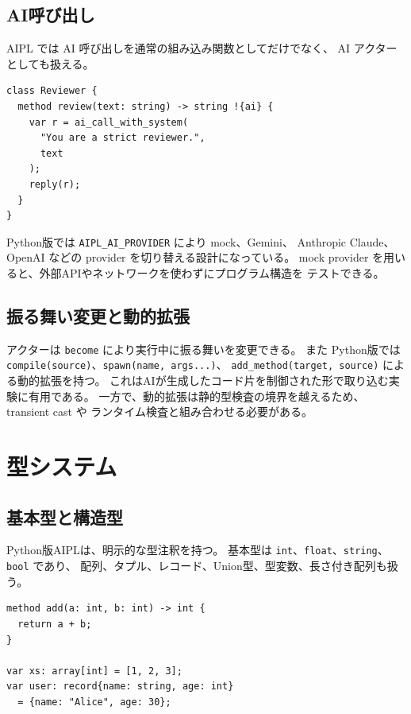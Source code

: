 \documentclass[11pt,a4paper,uplatex,dvipdfmx]{jsarticle}
\newcommand{\code}[1]{\texttt{#1}}
\begin{document}
\subsection{AI呼び出し}

AIPL では AI 呼び出しを通常の組み込み関数としてだけでなく、
AI アクターとしても扱える。

\begin{lstlisting}
class Reviewer {
  method review(text: string) -> string !{ai} {
    var r = ai_call_with_system(
      "You are a strict reviewer.",
      text
    );
    reply(r);
  }
}
\end{lstlisting}

Python版では \code{AIPL\_AI\_PROVIDER} により mock、Gemini、
Anthropic Claude、OpenAI などの provider を切り替える設計になっている。
mock provider を用いると、外部APIやネットワークを使わずにプログラム構造を
テストできる。

\subsection{振る舞い変更と動的拡張}

アクターは \code{become} により実行中に振る舞いを変更できる。
また Python版では \code{compile(source)}、\code{spawn(name, args...)}、
\code{add\_method(target, source)} による動的拡張を持つ。
これはAIが生成したコード片を制御された形で取り込む実験に有用である。
一方で、動的拡張は静的型検査の境界を越えるため、transient cast や
ランタイム検査と組み合わせる必要がある。

\section{型システム}

\subsection{基本型と構造型}

Python版AIPLは、明示的な型注釈を持つ。
基本型は \code{int}、\code{float}、\code{string}、\code{bool} であり、
配列、タプル、レコード、Union型、型変数、長さ付き配列も扱う。

\begin{lstlisting}
method add(a: int, b: int) -> int {
  return a + b;
}

var xs: array[int] = [1, 2, 3];
var user: record{name: string, age: int}
  = {name: "Alice", age: 30};
\end{lstlisting}
\end{document}
